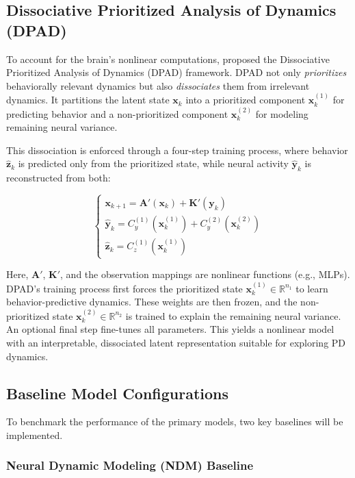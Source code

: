 \documentclass[12pt, a4paper]{article}
\begin{document}
\subsection{Dissociative Prioritized Analysis of Dynamics (DPAD)}

To account for the brain's nonlinear computations, \textcite{saniDissociativePrioritizedModeling2024} proposed the Dissociative Prioritized Analysis of Dynamics (DPAD) framework. DPAD not only \textit{prioritizes} behaviorally relevant dynamics but also \textit{dissociates} them from irrelevant dynamics. It partitions the latent state $\mathbf{x}_k$ into a prioritized component $\mathbf{x}_k^{(1)}$ for predicting behavior and a non-prioritized component $\mathbf{x}_k^{(2)}$ for modeling remaining neural variance.

This dissociation is enforced through a four-step training process, where behavior $\hat{\mathbf{z}}_k$ is predicted only from the prioritized state, while neural activity $\hat{\mathbf{y}}_k$ is reconstructed from both:

$$
    \begin{cases}
        \mathbf{x}_{k+1} = \mathbf{A}'(\mathbf{x}_k) + \mathbf{K}'(\mathbf{y}_k)           \\
        \hat{\mathbf{y}}_k = C_y^{(1)}(\mathbf{x}_k^{(1)}) + C_y^{(2)}(\mathbf{x}_k^{(2)}) \\
        \hat{\mathbf{z}}_k = C_z^{(1)}(\mathbf{x}_k^{(1)})
    \end{cases}
$$

Here, $\mathbf{A}'$, $\mathbf{K}'$, and the observation mappings are nonlinear functions (e.g., MLPs). DPAD's training process first forces the prioritized state $\mathbf{x}_k^{(1)} \in \mathbb{R}^{n_1}$ to learn behavior-predictive dynamics. These weights are then frozen, and the non-prioritized state $\mathbf{x}_k^{(2)} \in \mathbb{R}^{n_2}$ is trained to explain the remaining neural variance. An optional final step fine-tunes all parameters. This yields a nonlinear model with an interpretable, dissociated latent representation suitable for exploring PD dynamics.


\subsection{Baseline Model Configurations}
To benchmark the performance of the primary models, two key baselines will be implemented.

\subsubsection{Neural Dynamic Modeling (NDM) Baseline}
\end{document}
